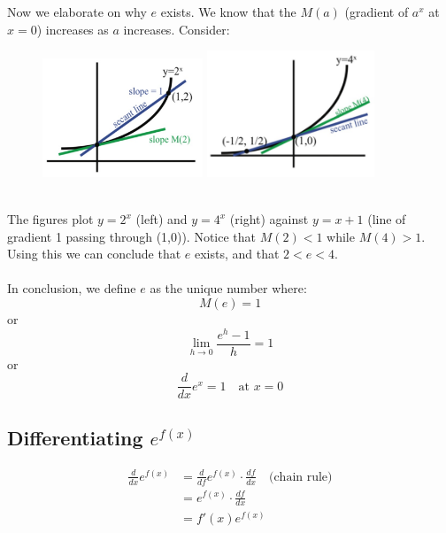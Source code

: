 \documentclass{report}
\begin{document}
Now we elaborate on why $e$ exists. We know that the $M(a)$ (gradient of $a^x$ at $x=0$) 
increases as $a$ increases. Consider:
\begin{figure}[h]
\includegraphics[width=4.8cm]{Capture17}
\includegraphics[width=5cm]{Capture18}
\centering
{}\\
\end{figure}\\
The figures plot $y=2^x$ (left) and $y=4^x$ (right) against $y=x+1$ (line of gradient 1 
passing through (1,0)). Notice that $M(2)<1$ while $M(4)>1$. Using this we can conclude
that $e$ exists, and that $2<e<4$.\\
\vspace{1mm}\\
In conclusion, we define $e$ as the unique number where:
\begin{equation*}
M(e)=1
\end{equation*}
or
\begin{equation*}
\lim_{h\to0}\frac{e^h-1}{h}=1
\end{equation*}
or
\begin{equation*}
\frac{d}{dx}e^x=1\quad\text{at $x=0$}
\end{equation*}

\subsection{Differentiating $e^{f(x)}$} %
\begin{align*}
\frac{d}{dx}e^{f(x)}&=\frac{d}{df}e^{f(x)}\cdot\frac{df}{dx}\quad\text{(chain rule)}\\
&=e^{f(x)}\cdot\frac{df}{dx}\\
&=f'(x)e^{f(x)}
\end{align*}
\newpage
\end{document}
